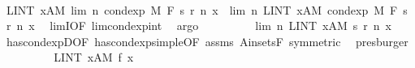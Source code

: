 \begin{isabellebody}
\isanewline
\ \ \ \ \isamarkupfalse%
\ {\isachardoublequoteopen}LINT\ x{\isacharcolon}{\kern0pt}A{\isacharbar}{\kern0pt}M{\isachardot}{\kern0pt}\ lim\ {\isacharparenleft}{\kern0pt}{\isasymlambda}n{\isachardot}{\kern0pt}\ cond{\isacharunderscore}{\kern0pt}exp\ M\ F\ {\isacharparenleft}{\kern0pt}s\ {\isacharparenleft}{\kern0pt}r\ n{\isacharparenright}{\kern0pt}{\isacharparenright}{\kern0pt}\ x{\isacharparenright}{\kern0pt}\ {\isacharequal}{\kern0pt}\ lim\ {\isacharparenleft}{\kern0pt}{\isasymlambda}n{\isachardot}{\kern0pt}\ LINT\ x{\isacharcolon}{\kern0pt}A{\isacharbar}{\kern0pt}M{\isachardot}{\kern0pt}\ cond{\isacharunderscore}{\kern0pt}exp\ M\ F\ {\isacharparenleft}{\kern0pt}s\ {\isacharparenleft}{\kern0pt}r\ n{\isacharparenright}{\kern0pt}{\isacharparenright}{\kern0pt}\ x{\isacharparenright}{\kern0pt}{\isachardoublequoteclose}\ \isamarkupfalse%
\ limI{\isacharbrackleft}{\kern0pt}OF\ lim{\isacharunderscore}{\kern0pt}cond{\isacharunderscore}{\kern0pt}exp{\isacharunderscore}{\kern0pt}int{\isacharbrackright}{\kern0pt}\ \isamarkupfalse%
\ argo\isanewline
\ \ \ \ \isamarkupfalse%
\ \isamarkupfalse%
\ {\isachardoublequoteopen}{\isachardot}{\kern0pt}{\isachardot}{\kern0pt}{\isachardot}{\kern0pt}\ {\isacharequal}{\kern0pt}\ lim\ {\isacharparenleft}{\kern0pt}{\isasymlambda}n{\isachardot}{\kern0pt}\ LINT\ x{\isacharcolon}{\kern0pt}A{\isacharbar}{\kern0pt}M{\isachardot}{\kern0pt}\ s\ {\isacharparenleft}{\kern0pt}r\ n{\isacharparenright}{\kern0pt}\ x{\isacharparenright}{\kern0pt}{\isachardoublequoteclose}\ \isamarkupfalse%
\ has{\isacharunderscore}{\kern0pt}cond{\isacharunderscore}{\kern0pt}expD{\isacharparenleft}{\kern0pt}{}{\isacharparenright}{\kern0pt}{\isacharbrackleft}{\kern0pt}OF\ has{\isacharunderscore}{\kern0pt}cond{\isacharunderscore}{\kern0pt}exp{\isacharunderscore}{\kern0pt}simple{\isacharbrackleft}{\kern0pt}OF\ assms{\isacharparenleft}{\kern0pt}{}{\isacharcomma}{\kern0pt}{}{\isacharparenright}{\kern0pt}{\isacharbrackright}{\kern0pt}\ A{\isacharunderscore}{\kern0pt}in{\isacharunderscore}{\kern0pt}sets{\isacharunderscore}{\kern0pt}F{\isacharcomma}{\kern0pt}\ symmetric{\isacharbrackright}{\kern0pt}\ \isamarkupfalse%
\ presburger\isanewline
\ \ \ \ \isamarkupfalse%
\ \isamarkupfalse%
\ {\isachardoublequoteopen}{\isachardot}{\kern0pt}{\isachardot}{\kern0pt}{\isachardot}{\kern0pt}\ {\isacharequal}{\kern0pt}\ LINT\ x{\isacharcolon}{\kern0pt}A{\isacharbar}{\kern0pt}M{\isachardot}{\kern0pt}\ f\ x{\isachardoublequoteclose}\ \isamarkupfalse%

\end{isabellebody}

